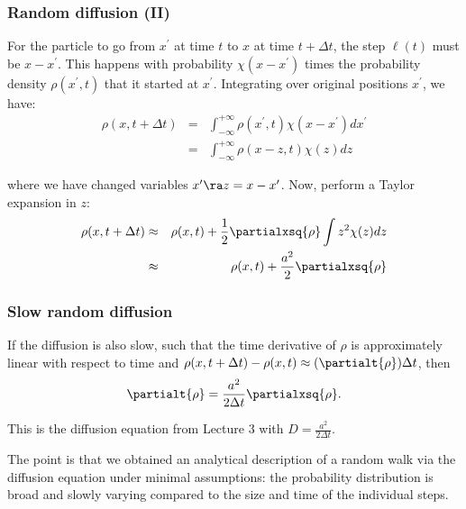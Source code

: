 \documentclass[hyperref={colorlinks=true}]{beamer}
\begin{document}

\begin{frame}%
  \frametitle{Random diffusion (II)}
  
  For the particle to go from $x^{\prime}$ at time $t$ to $x$ at time $t+\Delta t$, the step $\ell(t)$ must be $x - x^{\prime}$. This happens with probability $\chi(x - x^{\prime})$ times the probability density $\rho(x^{\prime} , t)$ that it started at $x^{\prime}$. Integrating over original positions $x^{\prime}$, we have:
  \begin{eqnarray}
    \rho(x, t + \Delta t) &=& \int_{-\infty}^{+\infty} \rho(x^{\prime}, t) \chi(x - x^{\prime}) dx^{\prime} \\
                          &=& \int_{-\infty}^{+\infty} \rho(x - z, t) \chi(z) dz
  \end{eqnarray}

  where we have changed variables $x^{\prime} \ra z = x - x^{\prime}$. Now, perform a Taylor expansion in $z$:
  \begin{eqnarray}
    \rho(x, t + \Delta t) &\approx& \rho(x,t) + \frac{1}{2} \partialxsq{\rho} \int z^2 \chi(z) dz \\
                          &\approx& \rho(x,t) + \frac{a^2}{2} \partialxsq{\rho}
  \end{eqnarray}

\end{frame}


\begin{frame}%
  \frametitle{Slow random diffusion}
  
  If the diffusion is also slow, such that the time derivative of $\rho$ is approximately linear with respect to time and $\rho(x, t + \Delta t) - \rho(x, t) \approx (\partialt{\rho}) \Delta t$, then
  \begin{eqnarray}
    \partialt{\rho} = \frac{a^2}{2 \Delta t} \partialxsq{\rho}.
  \end{eqnarray}

  This is the diffusion equation from Lecture 3 with $D=\frac{a^2}{2 \Delta t}$.
  
  \vspace{0.3cm}
  
  The point is that we obtained an analytical description of a random walk via the diffusion equation under minimal assumptions: the probability distribution is broad and slowly varying compared to the size and time of the individual steps.

\end{frame}
\end{document}
